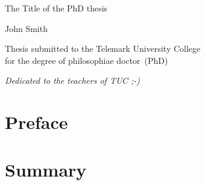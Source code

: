 \documentclass[11pt,openright]{book} %
\begin{document}
\frontmatter  %
\begin{titlepage}
  \begin{center}
    \Huge{The Title of the PhD thesis}
  \end{center}
  \begin{center}
    \Large{John Smith}
  \end{center}
  \begin{center}
    \large{Thesis submitted to the Telemark University College\\ for the degree of philosophiae doctor~(PhD)}
  \end{center}
\end{titlepage}\cleardoublepage

\begin{flushright}
  \large{\emph{Dedicated to the teachers of TUC ;-)}}

\end{flushright}



\chapter*{Preface}
\label{sec:preface}
\lipsum[1-3]

\chapter*{Summary}
\label{sec:summary}
\lipsum[1-3]


\tableofcontents
{}
\listoffigures %
\end{document}
